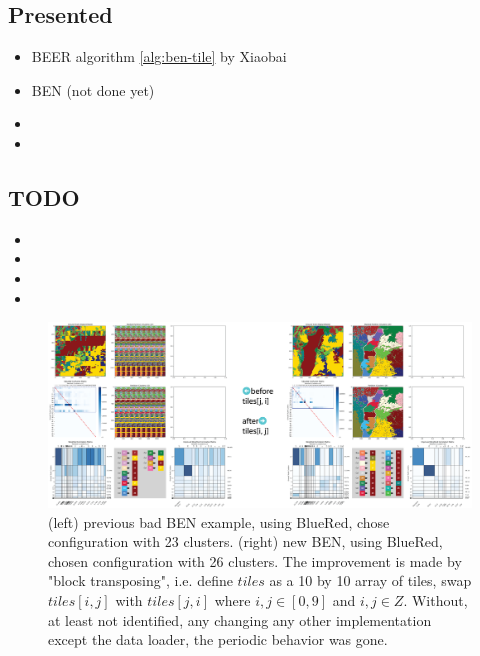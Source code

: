

\begin{multicols}{2}
\subsection*{Presented}
\begin{itemize}
    \item BEER algorithm \ref{alg:ben-tile}  by Xiaobai
    \item BEN (not done yet)
    \item 
    \item {}
\end{itemize}

\subsection*{TODO}
\begin{itemize}
    \item {}
    \item {}
    \item {}
    \item {}
\end{itemize}
\end{multicols}


\begin{figure}[htbp]
    \centering
    \includegraphics[width=\linewidth]{figures/24-10-07_BENimprove.png}
    \caption{(left) previous bad BEN example, using BlueRed, chose configuration with 23 clusters. (right) new BEN, using BlueRed, chosen configuration with 26 clusters. The improvement is made by "block transposing", i.e. define $tiles$ as a 10 by 10 array of tiles, swap $tiles[i,j]$ with $tiles[j,i]$ where $i,j \in [0,9]$ and $i,j \in Z$. Without, at least not identified, any changing any other implementation except the data loader, the periodic behavior was gone. } 
    \label{fig:24-10-07_BENimrove}
\end{figure}

\newpage

